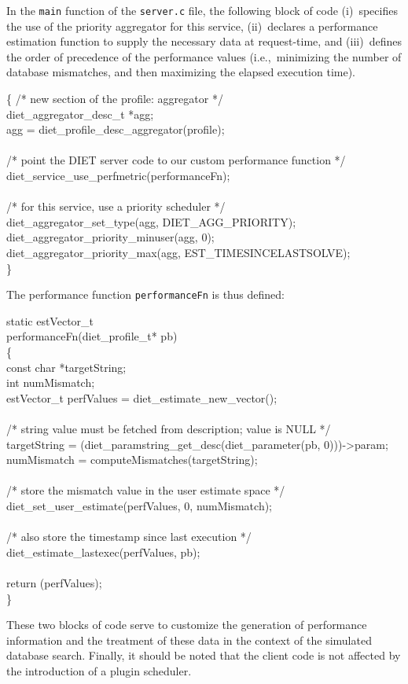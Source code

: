 In the \texttt{main} function of the \texttt{server.c} file, the
following block of code (i)~specifies the use of the priority
aggregator for this service, (ii)~declares a performance estimation
function to supply the necessary data at request-time, and
(iii)~defines the order of precedence of the performance values
(i.e.,~minimizing the number of database mismatches, and then
maximizing the elapsed execution time).
\begin{code}
  \{
    /* new section of the profile: aggregator */ \\
    diet\_aggregator\_desc\_t *agg; \\
    agg = diet\_profile\_desc\_aggregator(profile); \\
\\
    /* point the DIET server code to our custom performance function */ \\
    diet\_service\_use\_perfmetric(performanceFn); \\
\\
    /* for this service, use a priority scheduler */ \\
    diet\_aggregator\_set\_type(agg, DIET\_AGG\_PRIORITY); \\
    diet\_aggregator\_priority\_minuser(agg, 0); \\
    diet\_aggregator\_priority\_max(agg, EST\_TIMESINCELASTSOLVE); \\
  \}
\end{code}
The performance function \texttt{performanceFn} is thus defined:
\begin{code}
static estVector\_t \\
performanceFn(diet\_profile\_t* pb) \\
\{ \\
  const char *targetString; \\
  int numMismatch; \\
  estVector\_t perfValues = diet\_estimate\_new\_vector(); \\
\\
  /* string value must be fetched from description; value is NULL */ \\
  targetString = (diet\_paramstring\_get\_desc(diet\_parameter(pb, 0)))->param; \\
  numMismatch = computeMismatches(targetString); \\
\\
  /* store the mismatch value in the user estimate space */ \\
  diet\_set\_user\_estimate(perfValues, 0, numMismatch); \\
\\
  /* also store the timestamp since last execution */ \\
  diet\_estimate\_lastexec(perfValues, pb); \\
\\
  return (perfValues); \\
\}
\end{code}
These two blocks of code serve to customize the generation of
performance information and the treatment of these data in the context
of the simulated database search.
Finally, it should be noted that the client code is not affected by
the introduction of a plugin scheduler.

